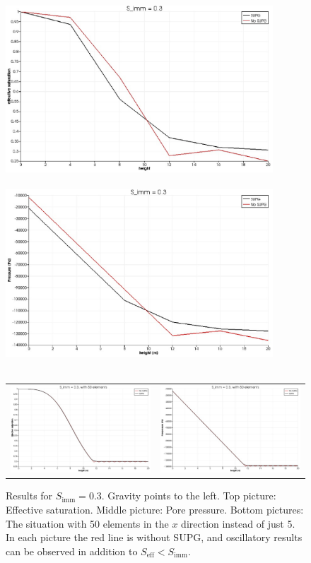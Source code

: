 \documentclass[]{scrreprt}
\begin{document}
\begin{figure}[htb]
\centering
\includegraphics[width=10cm]{gh_seff.eps} \\
$\mbox{}$ \\
\includegraphics[width=10cm]{gh_p.eps} \\
$\mbox{}$ \\
\begin{tabular}{cc}
\includegraphics[width=8cm]{gh_seff_50.eps} &
\includegraphics[width=8cm]{gh_p_50.eps} 
\end{tabular}
\caption{Results for $S_{\mathrm{imm}}=0.3$.  Gravity points to the
  left.  Top picture: Effective saturation.  Middle picture: Pore
  pressure.  Bottom pictures: The situation with 50 elements in the
  $x$ direction instead of just 5.  In each picture the red line is
  without SUPG, and oscillatory results can be observed in addition to
  $S_{\mathrm{eff}}< S_{\mathrm{imm}}$.}
\label{gh.fig}
\end{figure}
\end{document}
